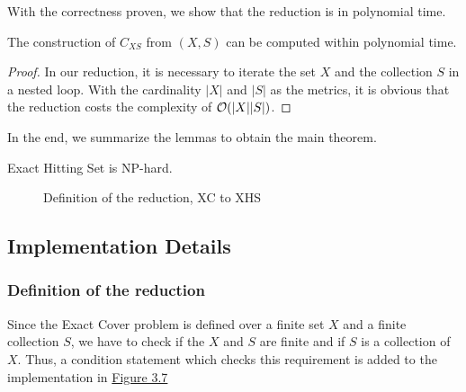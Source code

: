 With the correctness proven, we show that the reduction is in polynomial time. 
\begin{lemma}
    The construction of $C_{XS}$ from $(X, S)$ can be computed within polynomial time. 
\end{lemma}
\begin{proof}
    In our reduction, it is necessary to iterate the set $X$ and the collection $S$ in a nested loop. 
With the cardinality $|X|$ and $|S|$ as the metrics, it is obvious that the reduction costs the complexity of $\mathcal{O}({|X||S|})$.
\end{proof}
In the end, we summarize the lemmas to obtain the main theorem.
\begin{theorem}
    Exact Hitting Set is NP-hard.
\end{theorem}

\begin{figure}[!ht]
    \caption{Definition of the reduction, XC to XHS}
    \label{fig:8}
\end{figure}

\subsection{Implementation Details}
\subsubsection{Definition of the reduction}
Since the Exact Cover problem is defined over a finite set $X$ and a finite collection $S$, we have to check if the $X$ and $S$ are finite and 
if $S$ is a collection of $X$. Thus, a condition statement which checks this requirement is added to the implementation in \hyperref[fig:8]{Figure 3.7}
